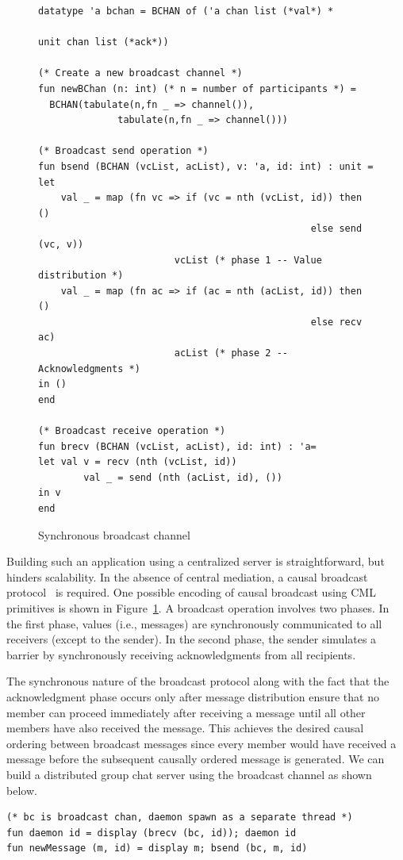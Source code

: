 \begin{figure}[t]
\begin{lstlisting}
datatype 'a bchan = BCHAN of ('a chan list (*val*) *
															unit chan list (*ack*))

(* Create a new broadcast channel *)
fun newBChan (n: int) (* n = number of participants *) =
  BCHAN(tabulate(n,fn _ => channel()),
			  tabulate(n,fn _ => channel()))

(* Broadcast send operation *)
fun bsend (BCHAN (vcList, acList), v: 'a, id: int) : unit =
let
	val _ = map (fn vc => if (vc = nth (vcList, id)) then ()
												else send (vc, v))
						vcList (* phase 1 -- Value distribution *)
	val _ = map (fn ac => if (ac = nth (acList, id)) then ()
												else recv ac)
						acList (* phase 2 -- Acknowledgments *)
in ()
end

(* Broadcast receive operation *)
fun brecv (BCHAN (vcList, acList), id: int) : 'a=
let val v = recv (nth (vcList, id))
		val _ = send (nth (acList, id), ())
in v
end
\end{lstlisting}
\caption{Synchronous broadcast channel}
\label{code:bchan}
\end{figure}

Building such an application using a centralized server is straightforward, but
hinders scalability. In the absence of central mediation, a causal broadcast
protocol~\cite{Birman87} is required. One possible encoding of causal broadcast
using CML primitives is shown in Figure~\ref{code:bchan}. A broadcast operation
involves two phases.  In the first phase, values (i.e., messages) are
synchronously communicated to all receivers (except to the sender).  In the
second phase, the sender simulates a barrier by synchronously receiving
acknowledgments from all recipients.

The synchronous nature of the broadcast protocol along with the fact that the
acknowledgment phase occurs only after message distribution ensure that no
member can proceed immediately after receiving a message until all other
members have also received the message. This achieves the desired causal
ordering between broadcast messages since every member would have received a
message before the subsequent causally ordered message is generated. We can
build a distributed group chat server using the broadcast channel as shown
below. \vfill

\lstset{numbers=none}
\begin{lstlisting}
(* bc is broadcast chan, daemon spawn as a separate thread *)
fun daemon id = display (brecv (bc, id)); daemon id
fun newMessage (m, id) = display m; bsend (bc, m, id)
\end{lstlisting}
\lstset{numbers=left,numberstyle=\tiny,stepnumber=1}

